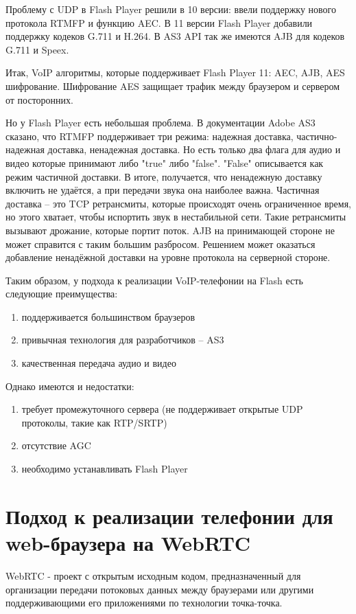 Проблему с UDP в Flash Player решили в 10 версии: ввели поддержку нового протокола RTMFP и функцию AEC. В 11 версии Flash Player добавили поддержку кодеков G.711 и H.264. В AS3 API так же имеются AJB для кодеков G.711 и Speex.

Итак, VoIP алгоритмы, которые поддерживает Flash Player 11: AEC, AJB, AES шифрование. Шифрование AES защищает трафик между браузером и сервером от посторонних.

Но у Flash Player есть небольшая проблема. В документации Adobe AS3 сказано, что RTMFP поддерживает три режима: надежная доставка, частично-надежная доставка, ненадежная доставка. Но есть только два флага для аудио и видео которые принимают либо "true" либо "false". "False" описывается как режим частичной доставки. В итоге, получается, что ненадежную доставку включить не удаётся, а при передачи звука она наиболее важна. Частичная доставка – это TCP ретрансмиты, которые происходят очень ограниченное время, но этого хватает, чтобы испортить звук в нестабильной сети. Такие ретрансмиты вызывают дрожание, которые портит поток. AJB на принимающей стороне не может справится с таким большим разбросом. Решением может оказаться добавление ненадёжной доставки на уровне протокола на серверной стороне.

Таким образом, у подхода к реализации VoIP-телефонии на Flash есть следующие преимущества:
\begin{enumerate}
\item поддерживается большинством браузеров
\item привычная технология для разработчиков – AS3
\item качественная передача аудио и видео
\end{enumerate}

Однако имеются и недостатки:
\begin{enumerate}
\item требует промежуточного сервера (не поддерживает открытые UDP протоколы, такие как RTP/SRTP)
\item отсутствие AGC
\item необходимо устанавливать Flash Player
\end{enumerate}

\section{Подход к реализации телефонии для web-браузера на WebRTC}

WebRTC - проект с открытым исходным кодом, предназначенный для организации передачи потоковых данных между браузерами или другими поддерживающими его приложениями по технологии точка-точка.\cite{WebRTC}

